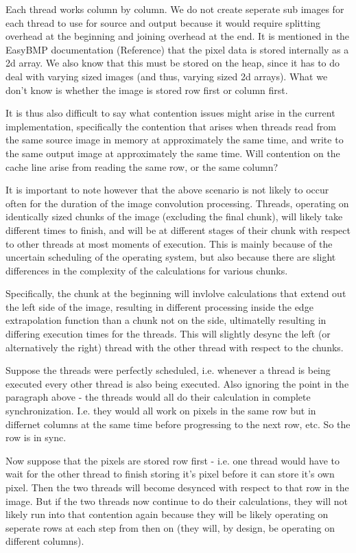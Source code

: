 \documentclass[paper=a4, fontsize=11pt]{scrartcl} %
\numberwithin{equation}{section} %
\numberwithin{figure}{section} %
\numberwithin{table}{section} %
\begin{document}
Each thread works column by column. We do not create seperate sub images for each thread to use for source and output because it would require splitting overhead at the beginning and joining overhead at the end. It is mentioned in the EasyBMP documentation (Reference) that the pixel data is stored internally as a 2d array. We also know that this must be stored on the heap, since it has to do deal with varying sized images (and thus, varying sized 2d arrays). What we don't know is whether the image is stored row first or column first. 

It is thus also difficult to say what contention issues might arise in the current implementation, specifically the contention that arises when threads read from the same source image in memory at approximately the same time, and write to the same output image at approximately the same time. Will contention on the cache line arise from reading the same row, or the same column?

It is important to note however that the above scenario is not likely to occur often for the duration of the image convolution processing. Threads, operating on identically sized chunks of the image (excluding the final chunk), will likely take different times to finish, and will be at different stages of their chunk with respect to other threads at most moments of execution. This is mainly because of the uncertain scheduling of the operating system, but also because there are slight differences in the complexity of the calculations for various chunks.

Specifically, the chunk at the beginning will invlolve calculations that extend out the left side of the image, resulting in different processing inside the edge extrapolation function than a chunk not on the side, ultimatelly resulting in differing execution times for the threads. This will slightly desync the left (or alternatively the right) thread with the other thread with respect to the chunks.

Suppose the threads were perfectly scheduled, i.e. whenever a thread is being executed every other thread is also being executed. Also ignoring the point in the paragraph above - the threads would all do their calculation in complete synchronization. I.e. they would all work on pixels in the same row but in differnet columns at the same time before progressing to the next row, etc. So the row is in sync.

Now suppose that the pixels are stored row first - i.e. one thread would have to wait for the other thread to finish storing it's pixel before it can store it's own pixel. Then the two threads will become desynced with respect to that row in the image. But if the two threads now continue to do their calculations, they will not likely run into that contention again because they will be likely operating on seperate rows at each step from then on (they will, by design, be operating on different columns).
\end{document}
